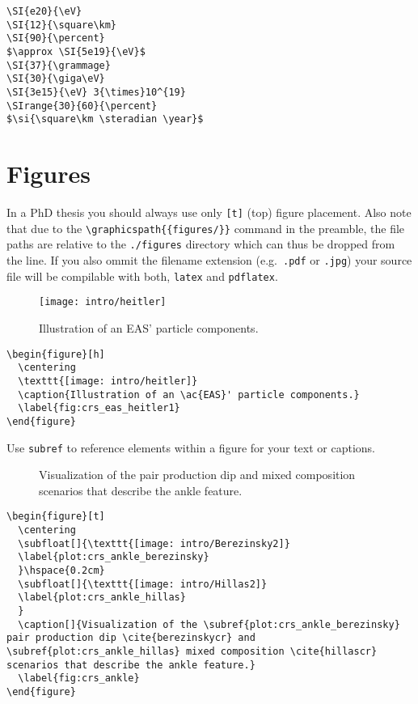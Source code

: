 \begin{lstlisting}
\SI{e20}{\eV}
\SI{12}{\square\km}
\SI{90}{\percent} 
$\approx \SI{5e19}{\eV}$
\SI{37}{\grammage}
\SI{30}{\giga\eV} 
\SI{3e15}{\eV} 3{\times}10^{19}
\SIrange{30}{60}{\percent} 
$\si{\square\km \steradian \year}$
\end{lstlisting}



\section{Figures}

In a PhD thesis you should always use only \verb![t]! (top) figure placement. Also note that due to the \verb!\graphicspath{{figures/}}! command in the preamble, the file paths are relative to the \verb!./figures! directory which can thus be dropped from the line. If you also ommit the filename extension (e.g.\ \verb!.pdf! or \verb!.jpg!) your source file will be compilable with both, \verb!latex! and \verb!pdflatex!.

\begin{figure}[t]
  \centering
  \texttt{[image: intro/heitler]}
  \caption{Illustration of an \ac{EAS}' particle components.}
  \label{fig:crs_eas_heitler1}
\end{figure}
\begin{lstlisting}
\begin{figure}[h]
  \centering
  \texttt{[image: intro/heitler]}
  \caption{Illustration of an \ac{EAS}' particle components.}
  \label{fig:crs_eas_heitler1}
\end{figure}
\end{lstlisting}
\newpage

Use \verb!subref! to reference elements within a figure for your text or captions. 

\begin{figure}[t]
  \centering
  \hspace{0.2cm}
  \caption[]{Visualization of the  pair production dip \cite{berezinskycr} and  mixed composition \cite{hillascr} scenarios that describe the ankle feature.}
  \label{fig:crs_ankle}
\end{figure}
\begin{lstlisting}
\begin{figure}[t]
  \centering
  \subfloat[]{\texttt{[image: intro/Berezinsky2]}
  \label{plot:crs_ankle_berezinsky}
  }\hspace{0.2cm}
  \subfloat[]{\texttt{[image: intro/Hillas2]}
  \label{plot:crs_ankle_hillas}
  }
  \caption[]{Visualization of the \subref{plot:crs_ankle_berezinsky} pair production dip \cite{berezinskycr} and \subref{plot:crs_ankle_hillas} mixed composition \cite{hillascr} scenarios that describe the ankle feature.}
  \label{fig:crs_ankle}
\end{figure}
\end{lstlisting}


